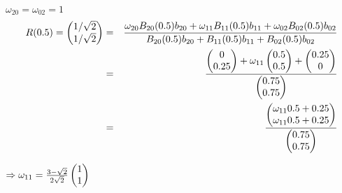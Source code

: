 $\omega_{20} = \omega_{02} = 1$
\begin{eqnarray}
    R(0.5)= \left( \begin{matrix}1/\sqrt{2} \\ 1/\sqrt{2}\end{matrix}\right) &=& 
    \frac{\omega_{20} B_{20}(0.5) b_{20} + \omega_{11} B_{11}(0.5) b_{11} +\omega_{02} B_{02}(0.5) b_{02} }{B_{20}(0.5) b_{20} + B_{11}(0.5) b_{11} + B_{02}(0.5) b_{02}} \\
    &=& \frac{ \left( \begin{matrix}0 \\ 0.25\end{matrix}\right) + \omega_{11} \left( \begin{matrix}0.5 \\ 0.5\end{matrix}\right) +\left( \begin{matrix}0.25 \\ 0\end{matrix}\right) }{\left( \begin{matrix}0.75 \\ 0.75\end{matrix}\right)} \\    
     &=& \frac{ \left( \begin{matrix}\omega_{11} 0.5 + 0.25 \\ \omega_{11} 0.5 + 0.25\end{matrix}\right)  }{\left( \begin{matrix}0.75 \\ 0.75\end{matrix}\right)} 
\end{eqnarray}


$\Rightarrow \omega_{11} = \frac{3-\sqrt{2}}{2\sqrt{2}}\left( \begin{matrix}1 \\ 1\end{matrix}\right)$
